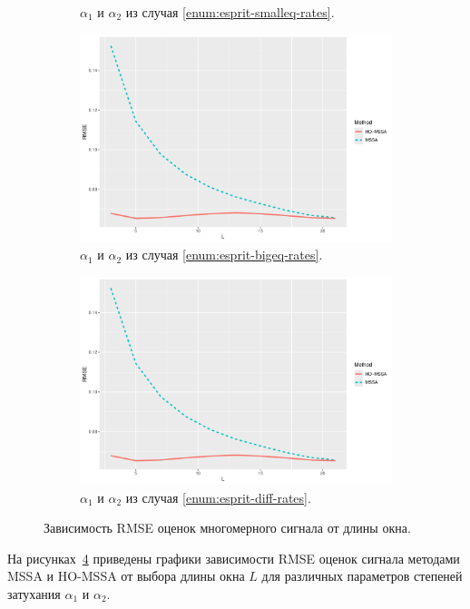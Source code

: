 \documentclass[specialist,
  substylefile=spbu_report.rtx,
subf,href,colorlinks=true, 12pt]{disser}
\theoremstyle{plain}
\theoremstyle{definition}
\theoremstyle{remark}
\begin{document}
\begin{figure}
\begin{subfigure}{0.49\linewidth}
    \caption{$\alpha_1$ и $\alpha_2$ из случая
    \ref{enum:esprit-smalleq-rates}.}
    \label{fig:L_rmse_smalleq_rates}
  \end{subfigure}
  \begin{subfigure}{0.49\linewidth}
    \includegraphics[width=\linewidth,
    height=0.167\textheight]{rec_L_rmse_large_eq_rates.pdf}
    \caption{$\alpha_1$ и $\alpha_2$ из случая \ref{enum:esprit-bigeq-rates}.}
    \label{fig:L_rmse_bigeq_rates}
  \end{subfigure}
  \begin{subfigure}{0.49\linewidth}
    \includegraphics[width=\linewidth,
    height=0.167\textheight]{rec_L_rmse.pdf}
    \caption{$\alpha_1$ и $\alpha_2$ из случая \ref{enum:esprit-diff-rates}.}
    \label{fig:L_rmse_diff_rates}
  \end{subfigure}
  \caption{Зависимость RMSE оценок многомерного сигнала от длины окна.}
  \label{fig:mv_L_rmse}
\end{figure}
На рисунках~\ref{fig:mv_L_rmse} приведены графики
зависимости RMSE оценок
сигнала методами MSSA и HO-MSSA от выбора длины окна $L$ для различных
параметров степеней затухания $\alpha_1$ и $\alpha_2$.
\end{document}
